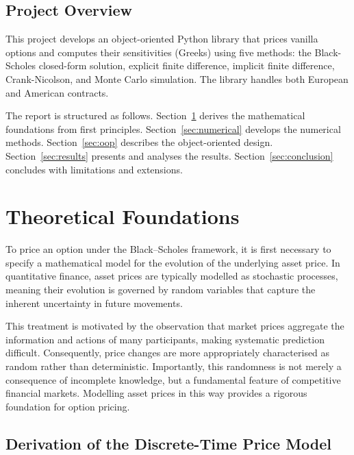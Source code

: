 \documentclass[12pt]{article}
\begin{document}
\subsection{Project Overview}

This project develops an object-oriented Python library that prices vanilla options and computes their sensitivities (Greeks) using five methods: the Black-Scholes closed-form solution, explicit finite difference, implicit finite difference, Crank-Nicolson, and Monte Carlo simulation. The library handles both European and
American contracts.

The report is structured as follows. Section~\ref{sec:theory} derives the mathematical foundations from first principles. Section~\ref{sec:numerical} develops the numerical methods. Section~\ref{sec:oop} describes the object-oriented design. Section~\ref{sec:results} presents and analyses the results. Section~\ref{sec:conclusion} concludes with limitations and extensions.

\newpage

\section{Theoretical Foundations}
\label{sec:theory}

To price an option under the Black–Scholes framework, it is first necessary to specify a mathematical model for the evolution of the underlying asset price. In quantitative finance, asset prices are typically modelled as stochastic processes, meaning their evolution is governed by random variables that capture the inherent uncertainty in future movements.

This treatment is motivated by the observation that market prices aggregate the information and actions of many participants, making systematic prediction difficult. Consequently, price changes are more appropriately characterised as random rather than deterministic. Importantly, this randomness is not merely a consequence of incomplete knowledge, but a fundamental feature of competitive financial markets. Modelling asset prices in this way provides a rigorous foundation for option pricing.

\subsection{Derivation of the Discrete-Time Price Model}
\end{document}
